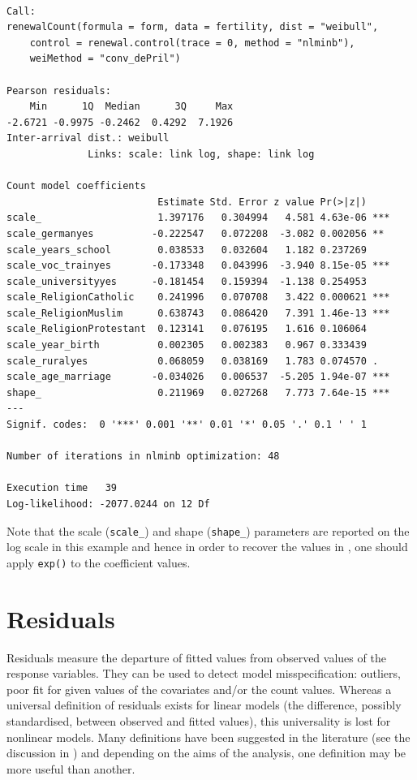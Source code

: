 \documentclass[a4paper,twoside,11pt]{article}
\begin{document}
\begin{verbatim}

Call:
renewalCount(formula = form, data = fertility, dist = "weibull", 
    control = renewal.control(trace = 0, method = "nlminb"), 
    weiMethod = "conv_dePril")

Pearson residuals:
    Min      1Q  Median      3Q     Max 
-2.6721 -0.9975 -0.2462  0.4292  7.1926 
Inter-arrival dist.: weibull 
              Links: scale: link log, shape: link log 

Count model coefficients
                          Estimate Std. Error z value Pr(>|z|)    
scale_                    1.397176   0.304994   4.581 4.63e-06 ***
scale_germanyes          -0.222547   0.072208  -3.082 0.002056 ** 
scale_years_school        0.038533   0.032604   1.182 0.237269    
scale_voc_trainyes       -0.173348   0.043996  -3.940 8.15e-05 ***
scale_universityyes      -0.181454   0.159394  -1.138 0.254953    
scale_ReligionCatholic    0.241996   0.070708   3.422 0.000621 ***
scale_ReligionMuslim      0.638743   0.086420   7.391 1.46e-13 ***
scale_ReligionProtestant  0.123141   0.076195   1.616 0.106064    
scale_year_birth          0.002305   0.002383   0.967 0.333439    
scale_ruralyes            0.068059   0.038169   1.783 0.074570 .  
scale_age_marriage       -0.034026   0.006537  -5.205 1.94e-07 ***
shape_                    0.211969   0.027268   7.773 7.64e-15 ***
---
Signif. codes:  0 '***' 0.001 '**' 0.01 '*' 0.05 '.' 0.1 ' ' 1 

Number of iterations in nlminb optimization: 48 

Execution time   39 
Log-likelihood: -2077.0244 on 12 Df
\end{verbatim}

Note that the scale (\texttt{scale\_}) and shape (\texttt{shape\_}) parameters are reported on
the log scale in this example and hence in order to recover the values in
\citep[Table 2]{mcshane2008count}, one should apply \texttt{exp()} to the coefficient
values.


\section{Residuals}
\label{sec:org7a154d6}

Residuals measure the departure of fitted values from observed values of
the response variables. 
They can be used to detect model misspecification:
outliers, poor fit for given values of the covariates and/or the count
values. Whereas a universal definition of residuals exists for linear models (the
difference, possibly standardised, between observed and fitted values), 
this universality is lost for
nonlinear models. Many definitions have been suggested in the literature (see
the discussion in \citet[Section 5.2]{cameron2013regression}) and depending on the
aims of the analysis, one definition may be more useful than another.
\end{document}

